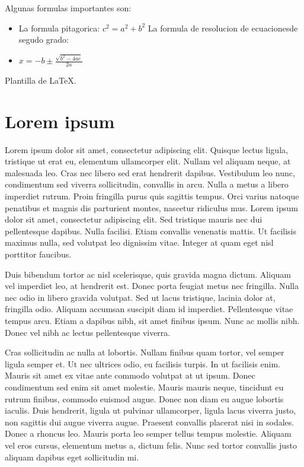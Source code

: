 \begin{itemize}
\newpage
Algunas formulas  importantes son:
\begin{itemize} 
\item La formula  pitagorica: $ c^2=a^2+b^2$  La formula de resolucion de ecuacionesde segudo grado:
\item $x=-b\pm\frac{\sqrt{b^2-4ac}}{2a}$
\end{itemize}



Plantilla de \LaTeX.\\

\section{Lorem ipsum}

Lorem ipsum dolor sit amet, consectetur adipiscing elit. Quisque lectus ligula,
tristique ut erat eu, elementum ullamcorper elit. Nullam vel aliquam neque, at
malesuada leo. Cras nec libero sed erat hendrerit dapibus. Vestibulum leo nunc,
condimentum sed viverra sollicitudin, convallis in arcu. Nulla a metus a libero
imperdiet rutrum. Proin fringilla purus quis sagittis tempus. Orci varius
natoque penatibus et magnis dis parturient montes, nascetur ridiculus mus. Lorem
ipsum dolor sit amet, consectetur adipiscing elit. Sed tristique mauris nec dui
pellentesque dapibus. Nulla facilisi. Etiam convallis venenatis mattis. Ut
facilisis maximus nulla, sed volutpat leo dignissim vitae. Integer at quam eget
nisl porttitor faucibus.

Duis bibendum tortor ac nisl scelerisque, quis gravida magna dictum. Aliquam vel
imperdiet leo, at hendrerit est. Donec porta feugiat metus nec fringilla. Nulla
nec odio in libero gravida volutpat. Sed ut lacus tristique, lacinia dolor at,
fringilla odio. Aliquam accumsan suscipit diam id imperdiet. Pellentesque vitae
tempus arcu. Etiam a dapibus nibh, sit amet finibus ipsum. Nunc ac mollis
nibh. Donec vel nibh ac lectus pellentesque viverra.

Cras sollicitudin ac nulla at lobortis. Nullam finibus quam tortor, vel semper
ligula semper et. Ut nec ultrices odio, eu facilisis turpis. In ut facilisis
enim. Mauris sit amet ex vitae ante commodo volutpat at ut ipsum. Donec
condimentum sed enim sit amet molestie. Mauris mauris neque, tincidunt eu rutrum
finibus, commodo euismod augue. Donec non diam eu augue lobortis iaculis. Duis
hendrerit, ligula ut pulvinar ullamcorper, ligula lacus viverra justo, non
sagittis dui augue viverra augue. Praesent convallis placerat nisi in
sodales. Donec a rhoncus leo. Mauris porta leo semper tellus tempus
molestie. Aliquam vel eros cursus, elementum metus a, dictum felis. Nunc sed
tortor convallis justo aliquam dapibus eget sollicitudin mi.


\end{itemize}
